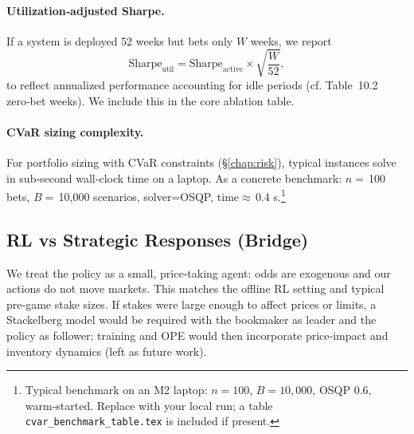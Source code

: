 \paragraph{Utilization‑adjusted Sharpe.} If a system is deployed 52 weeks but bets only $W$ weeks, we report
\[\mathrm{Sharpe}_{\mathrm{util}} = \mathrm{Sharpe}_{\mathrm{active}}\times\sqrt{\frac{W}{52}},\]
to reflect annualized performance accounting for idle periods (cf. Table~10.2 zero‑bet weeks). We include this in the core ablation table.

\paragraph{CVaR sizing complexity.} For portfolio sizing with CVaR constraints (\S\ref{chap:risk}), typical instances solve in sub‑second wall‑clock time on a laptop. As a concrete benchmark: $n=\,$100 bets, $B=\,$10{,}000 scenarios, solver=OSQP, time$\approx\,$0.4 s.\footnote{Typical benchmark on an M2 laptop: $n=100$, $B=10{,}000$, OSQP 0.6, warm‑started. Replace with your local run; a table \texttt{cvar\_benchmark\_table.tex} is included if present.}


\subsection{RL vs Strategic Responses (Bridge)}
We treat the policy as a small, price‑taking agent: odds are exogenous and our actions do not move markets. This matches the offline RL setting and typical pre‑game stake sizes. If stakes were large enough to affect prices or limits, a Stackelberg model would be required with the bookmaker as leader and the policy as follower; training and OPE would then incorporate price‑impact and inventory dynamics (left as future work).


